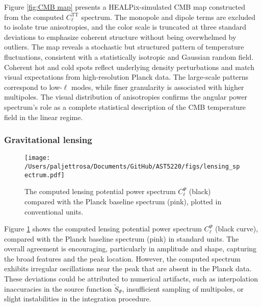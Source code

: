 \documentclass{aa}
\numberwithin{equation}{section}
\numberwithin{table}{section}
\numberwithin{figure}{section}
\begin{document}
Figure \ref{fig:CMB map} presents a HEALPix-simulated CMB map constructed from the computed $C_\ell^\text{TT}$ spectrum. The monopole and dipole terms are excluded to isolate true anisotropies, and the color scale is truncated at three standard deviations to emphasize coherent structure without being overwhelmed by outliers. The map reveals a stochastic but structured pattern of temperature fluctuations, consistent with a statistically isotropic and Gaussian random field. Coherent hot and cold spots reflect underlying density perturbations and match visual expectations from high-resolution Planck data. The large-scale patterns correspond to low-$\ell$ modes, while finer granularity is associated with higher multipoles. The visual distribution of anisotropies confirms the angular power spectrum's role as a complete statistical description of the CMB temperature field in the linear regime.





\subsubsection{Gravitational lensing}\label{subsubsec: IV results lensing}

\begin{figure}
\centering
\texttt{[image: /Users/paljettrosa/Documents/GitHub/AST5220/figs/lensing\_spectrum.pdf]}
\caption{The computed lensing potential power spectrum $C_\ell^\Psi$ (black) compared with the Planck baseline spectrum (pink), plotted in conventional units.}\label{fig:lensing spectrum}
\end{figure}

Figure \ref{fig:lensing spectrum} shows the computed lensing potential power spectrum $C_\ell^\Psi$ (black curve), compared with the Planck baseline spectrum (pink) in standard units. The overall agreement is encouraging, particularly in amplitude and shape, capturing the broad features and the peak location. However, the computed spectrum exhibits irregular oscillations near the peak that are absent in the Planck data. These deviations could be attributed to numerical artifacts, such as interpolation inaccuracies in the source function $\tilde{S}_\Psi$, insufficient sampling of multipoles, or slight instabilities in the integration procedure. 
\end{document}
